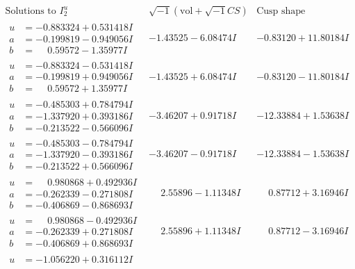 \documentclass[1p]{elsarticle_modified}
\theoremstyle{definition}
\newcommand{\I}{\sqrt{-1}}
\begin{document}
$$\begin{array}{c|c|c}  
\text{Solutions to }I^u_{2}& \I (\text{vol} + \sqrt{-1}CS) & \text{Cusp shape}\\
 \hline 
\begin{aligned}
u &= -0.883324 + 0.531418 I \\
a &= -0.199819 - 0.949056 I \\
b &= \phantom{-}0.59572 - 1.35977 I\end{aligned}
 & -1.43525 - 6.08474 I & -0.83120 + 11.80184 I \\ \hline\begin{aligned}
u &= -0.883324 - 0.531418 I \\
a &= -0.199819 + 0.949056 I \\
b &= \phantom{-}0.59572 + 1.35977 I\end{aligned}
 & -1.43525 + 6.08474 I & -0.83120 - 11.80184 I \\ \hline\begin{aligned}
u &= -0.485303 + 0.784794 I \\
a &= -1.337920 + 0.393186 I \\
b &= -0.213522 - 0.566096 I\end{aligned}
 & -3.46207 + 0.91718 I & -12.33884 + 1.53638 I \\ \hline\begin{aligned}
u &= -0.485303 - 0.784794 I \\
a &= -1.337920 - 0.393186 I \\
b &= -0.213522 + 0.566096 I\end{aligned}
 & -3.46207 - 0.91718 I & -12.33884 - 1.53638 I \\ \hline\begin{aligned}
u &= \phantom{-}0.980868 + 0.492936 I \\
a &= -0.262339 - 0.271808 I \\
b &= -0.406869 - 0.868693 I\end{aligned}
 & \phantom{-}2.55896 - 1.11348 I & \phantom{-}0.87712 + 3.16946 I \\ \hline\begin{aligned}
u &= \phantom{-}0.980868 - 0.492936 I \\
a &= -0.262339 + 0.271808 I \\
b &= -0.406869 + 0.868693 I\end{aligned}
 & \phantom{-}2.55896 + 1.11348 I & \phantom{-}0.87712 - 3.16946 I \\ \hline\begin{aligned}
u &= -1.056220 + 0.316112 I \\

\end{aligned}
\end{array}$$
\end{document}
